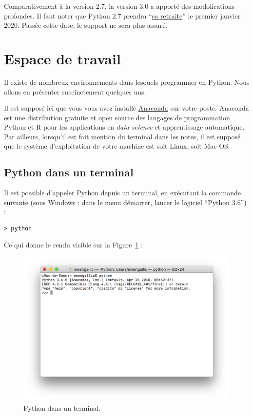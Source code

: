 \documentclass[12pt,]{book}
\numberwithin{equation}{section}
\numberwithin{countremarque}{section}
\begin{document}
Comparativement à la version 2.7, la version 3.0 a apporté des
modofications profondes. Il faut noter que Python 2.7 prendra
``\href{https://pythonclock.org/}{sa retraite}'' le premier janvier
2020. Passée cette date, le support ne sera plus assuré.

\section{Espace de travail}\label{espace-de-travail}

Il existe de nombreux environnements dans lesquels programmer en Python.
Nous allons en présenter succinctement quelques uns.

Il est supposé ici que vous vous avez installé
\href{https://www.anaconda.com/}{Anaconda} sur votre poste. Anaconda est
une distribution gratuite et open source des langages de programmation
Python et R pour les applications en \emph{data science} et
apprentissage automatique. Par ailleurs, lorsqu'il est fait mention du
terminal dans les notes, il est supposé que le système d'exploitation de
votre machine est soit Linux, soit Mac OS.

\subsection{Python dans un terminal}\label{python-dans-un-terminal}

Il est possible d'appeler Python depuis un terminal, en exécutant la
commande suivante (sous Windows : dans le menu démarrer, lancer le
logiciel ``Python 3.6'') :

\begin{lstlisting}
> python
\end{lstlisting}

Ce qui donne le rendu visible sur la
Figure~\ref{fig:intro-python-terminal} :

\begin{figure}[H]

{\centering \includegraphics[width=0.7\linewidth]{figs/python_terminal} 

}

\caption{Python dans un terminal.}\label{fig:intro-python-terminal}
\end{figure}
\end{document}
